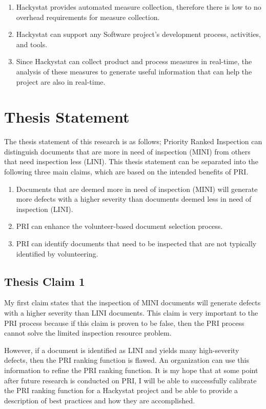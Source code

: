 \begin{enumerate}
\item Hackystat provides automated measure collection, therefore there is
  low to no overhead requirements for measure collection.
\item Hackystat can support any Software project's development process,
  activities, and tools.
\item Since Hackystat can collect product and process measures in
  real-time, the analysis of these measures to generate useful information
  that can help the project are also in real-time.
\end{enumerate}


\section{Thesis Statement}
The thesis statement of this research is as follows; Priority Ranked
Inspection can distinguish documents that are more in need of inspection
(MINI) from others that need inspection less (LINI). This thesis statement
can be separated into the following three main claims, which are based on
the intended benefits of PRI.

\begin{enumerate}
\item Documents that are deemed more in need of inspection (MINI) will
  generate more defects with a higher severity than documents deemed less
  in need of inspection (LINI).
\item PRI can enhance the volunteer-based document selection process.
\item PRI can identify documents that need to be inspected that are not
  typically identified by volunteering.
\end{enumerate}


\subsection{Thesis Claim 1}
My first claim states that the inspection of MINI documents will generate
defects with a higher severity than LINI documents. This claim is very
important to the PRI process because if this claim is proven to be false,
then the PRI process cannot solve the limited inspection resource problem.

However, if a document is identified as LINI and yields many high-severity
defects, then the PRI ranking function is flawed. An organization can use
this information to refine the PRI ranking function. It is my hope that at
some point after future research is conducted on PRI, I will be able to
successfully calibrate the PRI ranking function for a Hackystat project and
be able to provide a description of best practices and how they are
accomplished.

